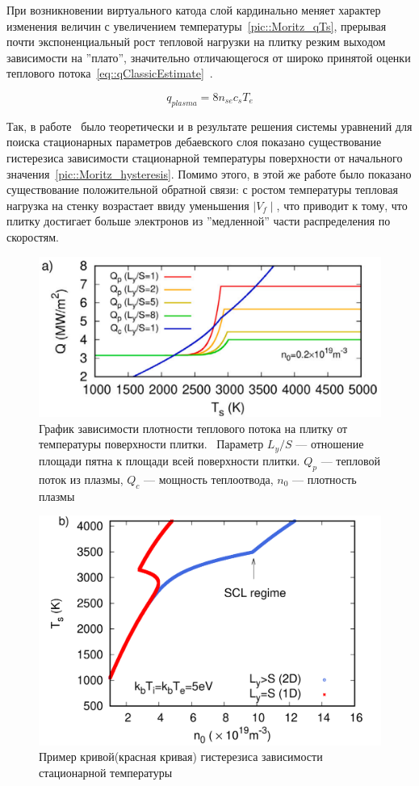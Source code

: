 При возникновении виртуального катода слой кардинально меняет характер изменения
величин с увеличением температуры~\autoref{pic::Moritz_qTs}, прерывая почти экспоненциальный рост тепловой
нагрузки на плитку резким выходом зависимости на ''плато'', значительно
отличающегося от широко принятой оценки теплового
потока~\eqref{eq::qClassicEstimate}~\cite{stangeby2000plasma}.


\begin{equation} 
    q_{plasma} = 8n_{se}c_sT_e 
    \label{eq::qClassicEstimate}
\end{equation}

Так, в работе~\cite{moritz2024simulated} было теоретически и в результате
решения системы уравнений для поиска стационарных параметров дебаевского слоя
показано существование гистерезиса зависимости стационарной температуры
поверхности от начального значения~\autoref{pic::Moritz_hysteresis}. Помимо этого, в этой же работе было показано
существование положительной обратной связи: с ростом температуры тепловая
нагрузка на стенку возрастает ввиду уменьшения $\mid V_f \mid$, что приводит к
тому, что плитку достигает больше электронов из ''медленной'' части
распределения по скоростям. 


\begin{figure}[H]
	\centering
	\includegraphics[width=0.7\linewidth]{material/Moritz_qTs.png}
    \caption[]{График зависимости плотности теплового потока на плитку от
    температуры поверхности плитки.~\cite{moritz2024simulated} Параметр $L_y/S$ --- отношение
площади пятна к площади всей поверхности плитки. $Q_p$ --- тепловой поток из
плазмы, $Q_c$ --- мощность теплоотвода, $n_0$ --- плотность плазмы}
	\label{pic::Moritz_qTs}
\end{figure}

\begin{figure}[H]
	\centering
	\includegraphics[width=0.7\linewidth]{material/Moritz_hysteresis.png}
    \caption[]{Пример кривой(красная кривая) гистерезиса зависимости
    стационарной температуры~\cite{moritz2024simulated}}
	\label{pic::Moritz_hysteresis}
\end{figure}

